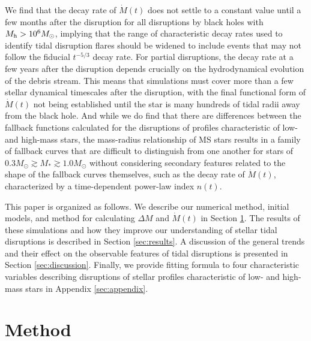 \documentclass[twocolumn]{emulateapj}
\newcommand{\md}{\dot{M}\left(t\right)}
\newcommand{\ms}{M_{\ast}}
\newcommand{\mh}{M_{\rm h}}
\newcommand{\msun}{M_{\odot}}
\begin{document}
We find that the decay rate of $\md$ does not settle to a constant  value until a few months after the disruption for all disruptions by black holes with $\mh > 10^{6} \msun$, implying that the range of characteristic decay rates used to identify tidal disruption flares should be widened to include events that may not follow the fiducial $t^{-5/3}$ decay rate. For partial disruptions, the decay rate at a few years after the disruption depends crucially on the hydrodynamical evolution of the debris stream. This means that simulations must cover more than a few stellar dynamical timescales after the disruption, with the final functional form of $\md$ not being established until the star is many hundreds of tidal radii away from the black hole. And while we do find that there are differences between the fallback functions calculated for the disruptions of profiles characteristic of low- and high-mass stars, the mass-radius relationship of MS stars results in a family of fallback curves that are difficult to distinguish from one another for stars of  $0.3 \msun \gtrsim \ms \gtrsim 1.0 \msun$ without considering secondary features related to the shape of the fallback curves themselves, such as the decay rate of $\md$, characterized by a time-dependent power-law index $n(t)$.

This paper is organized as follows. We describe our numerical method, initial models, and method for calculating $\Delta M$ and $\md$ in Section \ref{sec:method}. The results of these simulations and how they improve our understanding of stellar tidal disruptions is described in Section \ref{sec:results}. A discussion of the general trends and their effect on the observable features of tidal disruptions is presented in Section \ref{sec:discussion}. Finally, we provide fitting formula to four characteristic variables describing disruptions of stellar profiles characteristic of low- and high-mass stars in Appendix \ref{sec:appendix}.

\section{Method}\label{sec:method}
\end{document}
